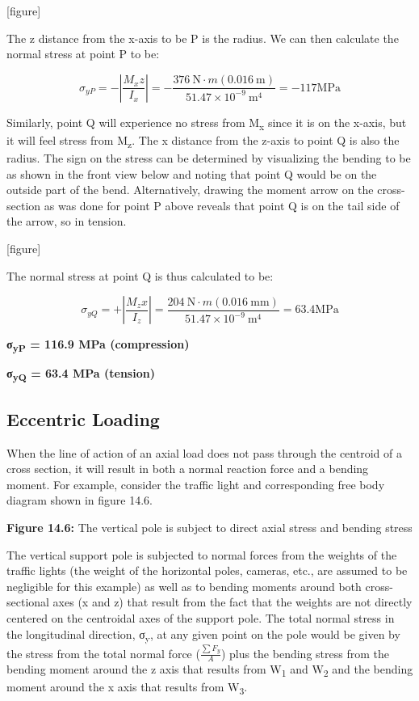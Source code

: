 \documentclass[
  letterpaper,
  DIV=11,
  numbers=noendperiod]{scrreprt}
\begin{document}
\begin{tcolorbox}
\begin{tcolorbox}
{[}figure{]}

The z distance from the x-axis to be P is the radius. We can then
calculate the normal stress at point P to be:

\[
\sigma_{y P}=-\left|\frac{M_x z}{I_x}\right|=-\frac{376 \mathrm{~N} \cdot m(0.016 \mathrm{~m})}{51.47 \times 10^{-9} \mathrm{~m}^4}=-117 \mathrm{MPa}
\]

Similarly, point Q will experience no stress from M\textsubscript{x}
since it is on the x-axis, but it will feel stress from
M\textsubscript{z}. The x distance from the z-axis to point Q is also
the radius. The sign on the stress can be determined by visualizing the
bending to be as shown in the front view below and noting that point Q
would be on the outside part of the bend. Alternatively, drawing the
moment arrow on the cross-section as was done for point P above reveals
that point Q is on the tail side of the arrow, so in tension.

{[}figure{]}

The normal stress at point Q is thus calculated to be:

\[
\sigma_{y Q}=+\left|\frac{M_z x}{I_z}\right|=\frac{204 \mathrm{~N} \cdot m(0.016 \mathrm{~mm})}{51.47 \times 10^{-9} \mathrm{~m}^4}=63.4 \mathrm{MPa}
\]

\textbf{σ\textsubscript{yP} = 116.9 MPa (compression)}

\textbf{σ\textsubscript{yQ} = 63.4 MPa (tension)}

\end{tcolorbox}

\end{tcolorbox}

\subsection{Eccentric Loading}\label{eccentric-loading}

When the line of action of an axial load does not pass through the
centroid of a cross section, it will result in both a normal reaction
force and a bending moment. For example, consider the traffic light and
corresponding free body diagram shown in figure 14.6.

\textbf{Figure 14.6:} The vertical pole is subject to direct axial
stress and bending stress

The vertical support pole is subjected to normal forces from the weights
of the traffic lights (the weight of the horizontal poles, cameras,
etc., are assumed to be negligible for this example) as well as to
bending moments around both cross-sectional axes (x and z) that result
from the fact that the weights are not directly centered on the
centroidal axes of the support pole. The total normal stress in the
longitudinal direction, σ\textsubscript{y}, at any given point on the
pole would be given by the stress from the total normal force
(\(\frac{\sum F_y}{A}\)) plus the bending stress from the bending moment
around the z axis that results from W\textsubscript{1} and
W\textsubscript{2} and the bending moment around the x axis that results
from W\textsubscript{3}.
\end{document}
